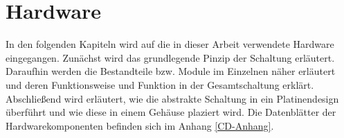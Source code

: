 
\newpage
\section{Hardware}
In den folgenden Kapiteln wird auf die in dieser Arbeit verwendete Hardware eingegangen. Zunächst wird das grundlegende Pinzip der Schaltung erläutert. Daraufhin werden die Bestandteile bzw. Module im Einzelnen näher erläutert und deren Funktionsweise und Funktion in der Gesamtschaltung erklärt. Abschließend wird erläutert, wie die abstrakte Schaltung in ein Platinendesign überführt und wie diese in einem Gehäuse plaziert wird. Die Datenblätter der Hardwarekomponenten befinden sich im Anhang \ref{CD-Anhang}.










